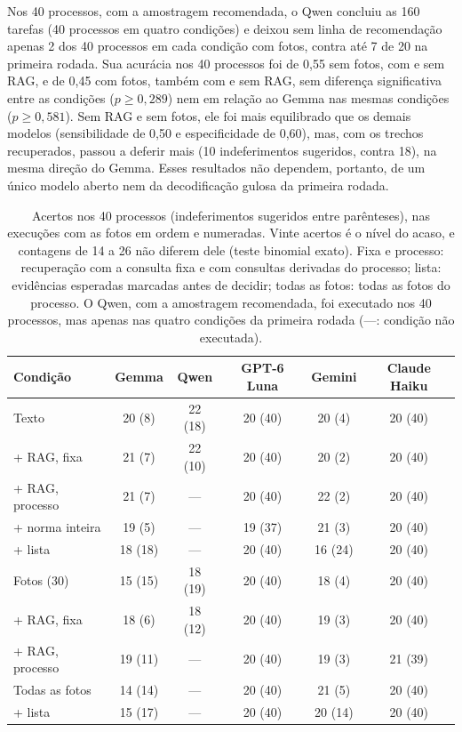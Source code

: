 Nos 40 processos, com a amostragem recomendada, o Qwen concluiu as 160 tarefas (40 processos em quatro condições) e deixou sem linha de recomendação apenas 2 dos 40 processos em cada condição com fotos, contra até 7 de 20 na primeira rodada. Sua acurácia nos 40 processos foi de 0,55 sem fotos, com e sem RAG, e de 0,45 com fotos, também com e sem RAG, sem diferença significativa entre as condições ($p\ge0{,}289$) nem em relação ao Gemma nas mesmas condições ($p\ge0{,}581$). Sem RAG e sem fotos, ele foi mais equilibrado que os demais modelos (sensibilidade de 0,50 e especificidade de 0,60), mas, com os trechos recuperados, passou a deferir mais (10 indeferimentos sugeridos, contra 18), na mesma direção do Gemma. Esses resultados não dependem, portanto, de um único modelo aberto nem da decodificação gulosa da primeira rodada.

\begin{table}[htb]
	\centering
	\caption{Acertos nos 40 processos (indeferimentos sugeridos entre parênteses), nas execuções com as fotos em ordem e numeradas. Vinte acertos é o nível do acaso, e contagens de 14 a 26 não diferem dele (teste binomial exato). Fixa e processo: recuperação com a consulta fixa e com consultas derivadas do processo; lista: evidências esperadas marcadas antes de decidir; todas as fotos: todas as fotos do processo. O Qwen, com a amostragem recomendada, foi executado nos 40 processos, mas apenas nas quatro condições da primeira rodada (---: condição não executada).}
	\label{tab:resultados}
	\small
	\begin{tabular}{|l|c|c|c|c|c|}
		\hline
		\textbf{Condição} & \textbf{Gemma} & \textbf{Qwen} & \textbf{GPT-6 Luna} & \textbf{Gemini} & \textbf{Claude Haiku} \\
		\hline
		Texto & 20 (8) & 22 (18) & 20 (40) & 20 (4) & 20 (40) \\
		\quad + RAG, fixa & 21 (7) & 22 (10) & 20 (40) & 20 (2) & 20 (40) \\
		\quad + RAG, processo & 21 (7) & --- & 20 (40) & 22 (2) & 20 (40) \\
		\quad + norma inteira & 19 (5) & --- & 19 (37) & 21 (3) & 20 (40) \\
		\quad + lista & 18 (18) & --- & 20 (40) & 16 (24) & 20 (40) \\
		Fotos (30) & 15 (15) & 18 (19) & 20 (40) & 18 (4) & 20 (40) \\
		\quad + RAG, fixa & 18 (6) & 18 (12) & 20 (40) & 19 (3) & 20 (40) \\
		\quad + RAG, processo & 19 (11) & --- & 20 (40) & 19 (3) & 21 (39) \\
		Todas as fotos & 14 (14) & --- & 20 (40) & 21 (5) & 20 (40) \\
		\quad + lista & 15 (17) & --- & 20 (40) & 20 (14) & 20 (40) \\
		\hline
	\end{tabular}
\end{table}

